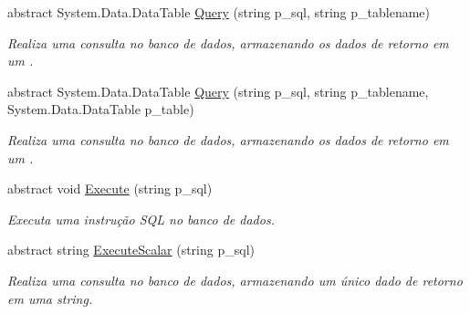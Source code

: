 \begin{DoxyCompactItemize}
abstract System.\+Data.\+Data\+Table \hyperlink{classSpartacus_1_1Database_1_1Generic_a23dc0eb8f4722d1adb1935044bc878ff}{Query} (string p\+\_\+sql, string p\+\_\+tablename)
\begin{DoxyCompactList}\small\item\em Realiza uma consulta no banco de dados, armazenando os dados de retorno em um . \end{DoxyCompactList}\item 
abstract System.\+Data.\+Data\+Table \hyperlink{classSpartacus_1_1Database_1_1Generic_a434ce0b27dfa73d909bc79c0b8471e54}{Query} (string p\+\_\+sql, string p\+\_\+tablename, System.\+Data.\+Data\+Table p\+\_\+table)
\begin{DoxyCompactList}\small\item\em Realiza uma consulta no banco de dados, armazenando os dados de retorno em um . \end{DoxyCompactList}\item 
abstract void \hyperlink{classSpartacus_1_1Database_1_1Generic_a28f1c8821906653eb4ff1484de893d16}{Execute} (string p\+\_\+sql)
\begin{DoxyCompactList}\small\item\em Executa uma instrução S\+Q\+L no banco de dados. \end{DoxyCompactList}\item 
abstract string \hyperlink{classSpartacus_1_1Database_1_1Generic_a983620fd71f520deb71ae55304b98bf6}{Execute\+Scalar} (string p\+\_\+sql)
\begin{DoxyCompactList}\small\item\em Realiza uma consulta no banco de dados, armazenando um único dado de retorno em uma string. \end{DoxyCompactList}\end{DoxyCompactItemize}

